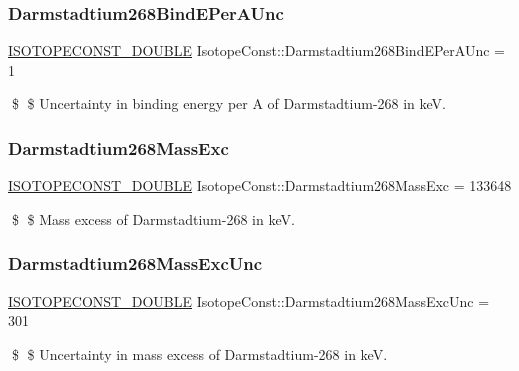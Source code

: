 \subsubsection{\texorpdfstring{Darmstadtium268\+Bind\+E\+Per\+A\+Unc}{Darmstadtium268BindEPerAUnc}}
{\footnotesize\ttfamily \mbox{\hyperlink{group___isotope_const-_macros_ga8f45a7272ce02c0b4c65c44636ed719a}{I\+S\+O\+T\+O\+P\+E\+C\+O\+N\+S\+T\+\_\+\+D\+O\+U\+B\+LE}} Isotope\+Const\+::\+Darmstadtium268\+Bind\+E\+Per\+A\+Unc = 1}

\$ \$ Uncertainty in binding energy per A of Darmstadtium-\/268 in keV. \mbox{\label{group___isotope_const-_darmstadtium-_ds268_gabc6ad0db2a2dc7f608ba23f34d841f10}} 
\subsubsection{\texorpdfstring{Darmstadtium268\+Mass\+Exc}{Darmstadtium268MassExc}}
{\footnotesize\ttfamily \mbox{\hyperlink{group___isotope_const-_macros_ga8f45a7272ce02c0b4c65c44636ed719a}{I\+S\+O\+T\+O\+P\+E\+C\+O\+N\+S\+T\+\_\+\+D\+O\+U\+B\+LE}} Isotope\+Const\+::\+Darmstadtium268\+Mass\+Exc = 133648}

\$ \$ Mass excess of Darmstadtium-\/268 in keV. \mbox{\label{group___isotope_const-_darmstadtium-_ds268_gaf6bfbe85d64177a1e93b1f35f312a9b7}} 
\subsubsection{\texorpdfstring{Darmstadtium268\+Mass\+Exc\+Unc}{Darmstadtium268MassExcUnc}}
{\footnotesize\ttfamily \mbox{\hyperlink{group___isotope_const-_macros_ga8f45a7272ce02c0b4c65c44636ed719a}{I\+S\+O\+T\+O\+P\+E\+C\+O\+N\+S\+T\+\_\+\+D\+O\+U\+B\+LE}} Isotope\+Const\+::\+Darmstadtium268\+Mass\+Exc\+Unc = 301}

\$ \$ Uncertainty in mass excess of Darmstadtium-\/268 in keV. \mbox{\label{group___isotope_const-_darmstadtium-_ds268_ga68c47ac3cdd90ea751953c0a34265999}} 
